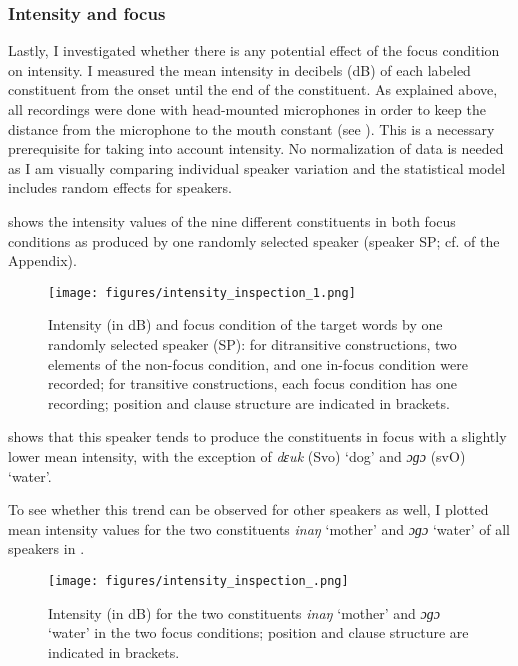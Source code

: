\subsubsection{Intensity and focus}
\label{sec:intensity-and-focus}

Lastly, I investigated whether there is any potential effect of the focus condition on intensity. I measured the mean intensity in decibels (dB) of each labeled constituent from the onset until the end of the constituent.   As explained above, all recordings were done with head-mounted microphones in order to keep the distance from the microphone to the mouth constant (see  ). This is a necessary prerequisite for taking into account intensity. No normalization of data is needed as I am visually comparing individual speaker variation and the statistical model includes random effects for speakers.

 shows the intensity values of the nine different constituents in both focus conditions as produced by one randomly selected speaker (speaker SP; cf.  	 of the Appendix).


\begin{figure}
	\texttt{[image: figures/intensity\_inspection\_1.png]}
	\caption{Intensity (in dB) and focus condition of the target words by one randomly selected speaker (SP): for ditransitive constructions, two elements of the non-focus condition, and one in-focus condition were recorded; for transitive constructions, each focus condition has one recording; position and clause structure are indicated in brackets.}
	\label{intensity_inspect_1}
\end{figure}

 shows that this speaker tends to produce the constituents in focus with a slightly lower mean intensity, with the exception of  \textit{dɛuk} (Svo) `dog' and \textit{ɔɡɔ} (svO) `water'. 

To see whether this trend can be observed for other speakers as well, I plotted mean intensity values for the two constituents  \textit{inaŋ} `mother' and \textit{ɔɡɔ} `water' of all speakers in  .


\begin{figure}
	\texttt{[image: figures/intensity\_inspection\_.png]}
	\caption{Intensity (in dB) for the two constituents \textit{inaŋ} ‘mother’ and \textit{ɔɡɔ} ‘water’ in the two focus conditions; position and clause structure are indicated in brackets.}
	\label{intensity_inspection_all}
\end{figure}

